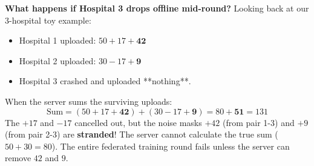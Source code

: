 \documentclass[11pt,a4paper]{report}
\begin{document}
\textbf{What happens if Hospital 3 drops offline mid-round?}
Looking back at our 3-hospital toy example:
\begin{itemize}[itemsep=1pt]
  \item Hospital 1 uploaded: $50 + 17 + \mathbf{42}$
  \item Hospital 2 uploaded: $30 - 17 + \mathbf{9}$
  \item Hospital 3 crashed and uploaded **nothing**.
\end{itemize}
When the server sums the surviving uploads:
\begin{equation}
\text{Sum} = (50 + 17 + \mathbf{42}) + (30 - 17 + \mathbf{9}) = 80 + \mathbf{51} = 131
\end{equation}
The $+17$ and $-17$ cancelled out, but the noise masks $+42$ (from pair 1-3) and $+9$ (from pair 2-3) are \textbf{stranded}! The server cannot calculate the true sum ($50 + 30 = 80$). The entire federated training round fails unless the server can remove $42$ and $9$.
\end{document}
